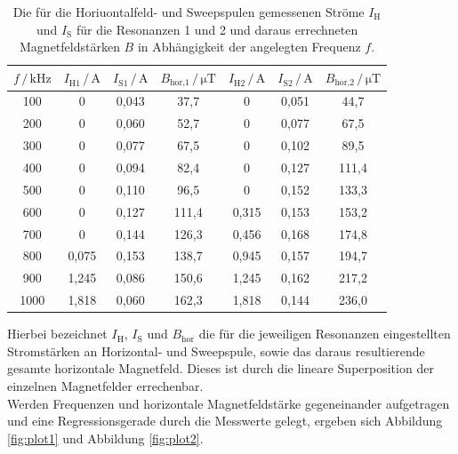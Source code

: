 \begin{table}
  \centering
  \caption{Die für die Horiuontalfeld- und Sweepspulen gemessenen Ströme $I_\text{H}$ und $I_\text{S}$ für die Resonanzen 1 und 2 und daraus errechneten Magnetfeldstärken $B$ in Abhängigkeit der angelegten Frequenz $f$.}
  \label{tab:mess1}
  \begin{tabular}{c c c c c c c}
  \toprule
  $f \,/\, \si{\kilo\hertz}$ & $I_\text{H1} \,/\, \si{\ampere}$ & $I_\text{S1} \,/\, \si{\ampere}$
  & $B_\text{hor,1} \,/\, \si{\micro\tesla}$ & $I_\text{H2} \,/\, \si{\ampere}$ & $I_\text{S2} \,/\, \si{\ampere}$
  & $B_\text{hor,2} \,/\, \si{\micro\tesla}$\\
  \midrule 
       100& 0    & 0,043&  37,7& 0    & 0,051&  44,7\\
       200& 0    & 0,060&  52,7& 0    & 0,077&  67,5\\
       300& 0    & 0,077&  67,5& 0    & 0,102&  89,5\\
       400& 0    & 0,094&  82,4& 0    & 0,127& 111,4\\
       500& 0    & 0,110&  96,5& 0    & 0,152& 133,3\\
       600& 0    & 0,127& 111,4& 0,315& 0,153& 153,2\\
       700& 0    & 0,144& 126,3& 0,456& 0,168& 174,8\\
       800& 0,075& 0,153& 138,7& 0,945& 0,157& 194,7\\
       900& 1,245& 0,086& 150,6& 1,245& 0,162& 217,2\\
      1000& 1,818& 0,060& 162,3& 1,818& 0,144& 236,0\\
  \bottomrule
  \end{tabular}
\end{table}

Hierbei bezeichnet $I_\text{H}$, $I_\text{S}$ und $B_\text{hor}$ die für die jeweiligen Resonanzen eingestellten Stromstärken an Horizontal- und 
Sweepspule, sowie das daraus resultierende gesamte horizontale Magnetfeld. Dieses ist durch die lineare Superposition der einzelnen Magnetfelder
errechenbar.\\
Werden Frequenzen und horizontale Magnetfeldstärke gegeneinander aufgetragen und eine Regressionsgerade durch die Messwerte gelegt, ergeben 
sich Abbildung \ref{fig:plot1} und Abbildung \ref{fig:plot2}.

